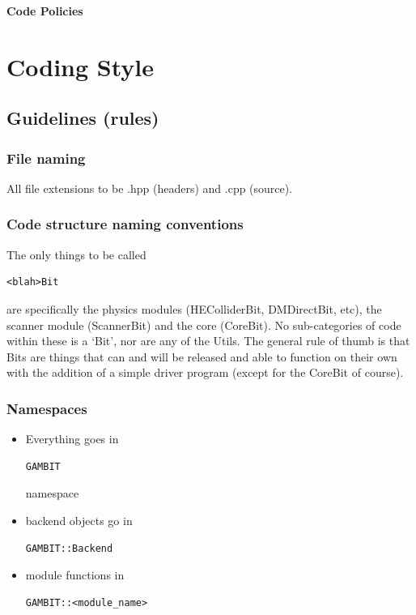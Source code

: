 

\centerline{\textbf{Code Policies}}\bigskip 

\section{Coding Style}

\subsection{Guidelines (rules)}

\subsubsection{File naming} All file extensions to be .hpp (headers) and .cpp (source).

\subsubsection{Code structure naming conventions} The only things to be called \begin{verbatim}<blah>Bit\end{verbatim} are specifically the physics modules (HEColliderBit, DMDirectBit, etc), the scanner module (ScannerBit) and the core (CoreBit). No sub-categories of code within these is a `Bit', nor are any of the Utils. The general rule of thumb is that Bits are things that can and will be released and able to function on their own with the addition of a simple driver program (except for the CoreBit of course).

\subsubsection{Namespaces} 
\begin{itemize} 
  \item Everything goes in \begin{verbatim}GAMBIT\end{verbatim} namespace
  \item backend objects go in \begin{verbatim}GAMBIT::Backend\end{verbatim}
  \item module functions in \begin{verbatim}GAMBIT::<module_name>\end{verbatim}
\end{itemize}


